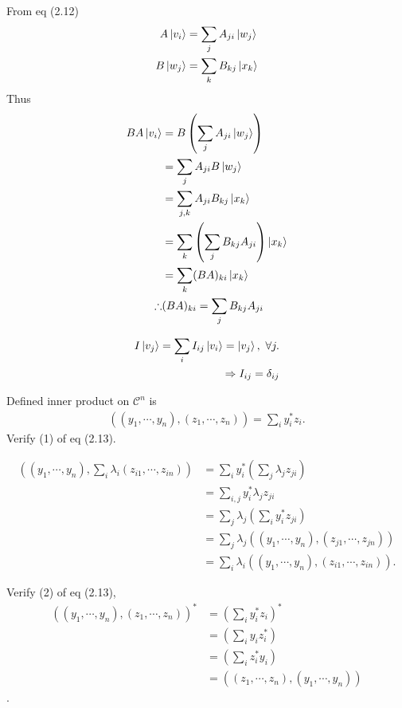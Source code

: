 From eq (2.12)
\begin{align*}
	A \ket{v_i} &= \sum_{j} A_{ji}\ket{w_j}\\
	B \ket{w_j} &= \sum_{k} B_{kj}\ket{x_k}
\end{align*}
%
Thus
\begin{align*}
	BA \ket{v_i} &= B \left( \sum_{j} A_{ji}\ket{w_j} \right)\\
	&= \sum_{j} A_{ji} B\ket{w_j}\\
	&= \sum_{j,k} A_{ji} B_{kj}\ket{x_k}\\
	&= \sum_k \left( \sum_j B_{kj} A_{ji}  \right) \ket{x_k}\\
	&= \sum_k (BA)_{ki} \ket{x_k}\\
	\therefore& (BA)_{ki} = \sum_j B_{kj} A_{ji}
\end{align*}



\begin{align*}
	I\ket{v_j} = \sum_i I_{ij} \ket{v_i} = \ket{v_j},\ \forall j.\\
	\Rightarrow I_{ij} = \delta_{ij}
\end{align*}



Defined inner product on $\mathcal{C}^n$ is
\begin{align*}
	\left(
		(y_1, \cdots, y_n), (z_1, \cdots, z_n)
	\right)
	= \sum_{i} y_i^* z_i .
\end{align*}
Verify (1) of eq (2.13).

\begin{align*}
	\left(
		(y_1, \cdots, y_n), \sum_i \lambda_i (z_{i1}, \cdots, z_{in})
	\right)
	&= \sum_i y_i^* \left(
										\sum_j \lambda_j z_{ji}
			      				   \right)\\
	&= \sum_{i,j} y_i^* \lambda_j z_{ji}\\
	&= \sum_j \lambda_j \left(\sum_i y_i^* z_{ji}  \right)\\
	&= \sum_j \lambda_j \left(
													(y_1, \cdots, y_n),  (z_{j1}, \cdots, z_{jn})
											  \right)\\
	&= \sum_i \lambda_i \left(
													(y_1, \cdots, y_n),  (z_{i1}, \cdots, z_{in})
												\right).
\end{align*}


Verify (2) of eq (2.13),
\begin{align}
	\left(
		(y_1, \cdots, y_n), (z_1, \cdots, z_n)
	\right)^*
	&= \left(\sum_i y_i^* z_i \right)^*\\
	&= \left(\sum_i y_i  z_i^* \right)\\
	&= \left(\sum_i z_i^* y_i \right)\\
	&= \left(
				(z_1, \cdots, z_n) , (y_1, \cdots, y_n)
			\right)
\end{align}.


